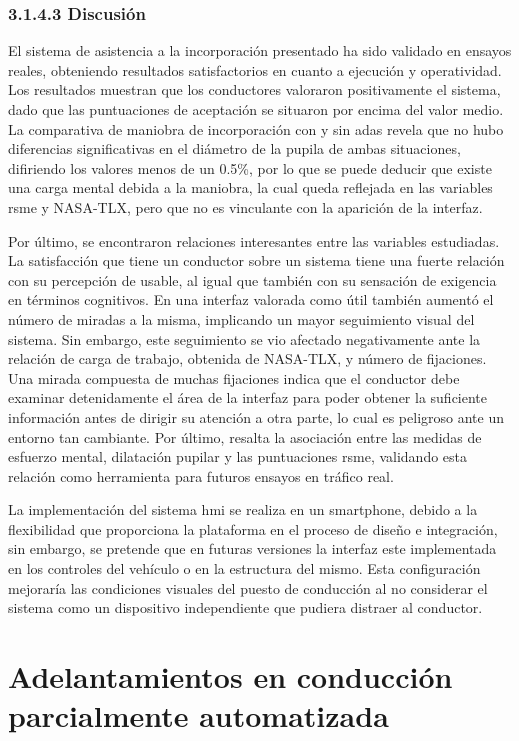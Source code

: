 \subsubsection{3.1.4.3	Discusión}\label{3143}

El sistema de asistencia a la incorporación presentado ha sido validado en ensayos reales, obteniendo resultados satisfactorios en cuanto a ejecución y operatividad. Los resultados muestran que los conductores valoraron positivamente el sistema, dado que las puntuaciones de aceptación se situaron por encima del valor medio. La comparativa de maniobra de incorporación con y sin \gls{adas} revela que no hubo diferencias significativas en el diámetro de la pupila de ambas situaciones, difiriendo los valores menos de un 0.5\%, por lo que se puede deducir que existe una carga mental debida a la maniobra, la cual queda reflejada en las variables \gls{rsme} y NASA-TLX, pero que no es vinculante con la aparición de la interfaz. 

Por último, se encontraron relaciones interesantes entre las variables estudiadas. La satisfacción que tiene un conductor sobre un sistema tiene una fuerte relación con su percepción de usable, al igual que también con su sensación de exigencia en términos cognitivos. En una interfaz valorada como útil también aumentó el número de miradas a la misma, implicando un mayor seguimiento visual del sistema. Sin embargo, este seguimiento se vio afectado negativamente ante la relación de carga de trabajo, obtenida de NASA-TLX, y número de fijaciones. Una mirada compuesta de muchas fijaciones indica que el conductor debe examinar detenidamente el área de la interfaz para poder obtener la suficiente información antes de dirigir su atención a otra parte, lo cual es peligroso ante un entorno tan cambiante. Por último, resalta la asociación entre las medidas de esfuerzo mental, dilatación pupilar y las puntuaciones \gls{rsme}, validando esta relación como herramienta para futuros ensayos en tráfico real.

La implementación del sistema \gls{hmi} se realiza en un smartphone, debido a la flexibilidad que proporciona la plataforma en el proceso de diseño e integración, sin embargo, se pretende que en futuras versiones la interfaz este implementada en los controles del vehículo o en la estructura del mismo. Esta configuración mejoraría las condiciones visuales del puesto de conducción al no considerar el sistema como un dispositivo independiente que pudiera distraer al conductor.

\section{Adelantamientos en conducción parcialmente automatizada}\label{32}

